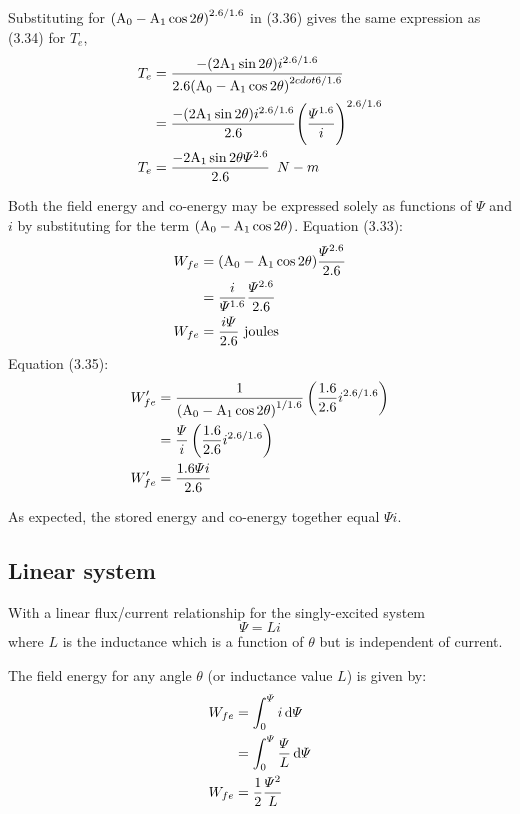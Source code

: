 \documentclass[a4paper,numbers=noenddot,12pt]{scrbook}
\begin{document}
Substituting for ${(\textup{A}_0 - \textup{A}_1 \cos 2 \theta)}^{2.6 / 1.6}$ in (3.36) gives the same expression as (3.34) for $T_e$,
\begin{align*}
    T_e & = \dfrac{-(2 \textup{A}_1 \sin 2 \theta)i^{2.6 / 1.6}}{2.6 {(\textup{A}_0 - \textup{A}_1 \cos 2 \theta)}^{2 cdot 6 / 1.6}} \\
    & = \dfrac{-(2 \textup{A}_1 \sin 2 \theta)i^{2.6 / 1.6}}{2.6} {\left( \dfrac{\varPsi^{1.6}}{i} \right)}^{2.6 / 1.6} \\
    T_e & = \dfrac{-2 \textup{A}_1 \sin 2 \theta \varPsi^{2.6}}{2.6} \enspace N - m 
\end{align*}

Both the field energy and co-energy may be expressed solely as functions of $\varPsi$ and $i$ by substituting for the term $(\textup{A}_0 - \textup{A}_1 \cos 2\theta)$. Equation (3.33):
\begin{align}
    W_{fe} & = (\textup{A}_0 - \textup{A}_1 \cos 2 \theta)\dfrac{\varPsi^{2.6}}{2.6} \nonumber \\
    & = \dfrac{i}{\varPsi^{1.6}} \dfrac{\varPsi^{2.6}}{2.6} \nonumber \\
    W_{fe} & = \dfrac{i \varPsi}{2.6} \  \text{joules}
    \label{eq:Eq3-37}
\end{align}
Equation (3.35):
\begin{align}
    W_{fe}' & = \dfrac{1}{{(\textup{A}_0 - \textup{A}_1 \cos 2 \theta)}^{1 /1.6}}\left( \dfrac{1.6}{2.6} i^{2.6 / 1.6} \right) \nonumber \\
    & = \dfrac{\varPsi}{i} \left( \dfrac{1.6}{2.6} i^{2.6 / 1.6}\right) \nonumber\\
    W_{fe}' & = \dfrac{1.6 \varPsi i}{2.6}
    \label{eq:Eq3.38}
\end{align}

As expected, the stored energy and co-energy together equal $\varPsi i$.
\subsection{Linear system}
With a linear flux/current relationship for the singly-excited system
\begin{equation}
    \varPsi = Li
    \label{eq:Eq3.39}
\end{equation}
where $L$ is the inductance which is a function of $\theta$ but is independent of current.

The field energy for any angle $\theta$ (or inductance value $L$) is given by:
\begin{align*}
    W_{fe} & = \int_0^{\varPsi} i \dif \varPsi \\
    & = \int_0^{\varPsi} \dfrac{\varPsi}{L} \dif \varPsi \\
    W_{fe} & = \dfrac{1}{2} \dfrac{\varPsi^2}{L}
\end{align*}
\end{document}
